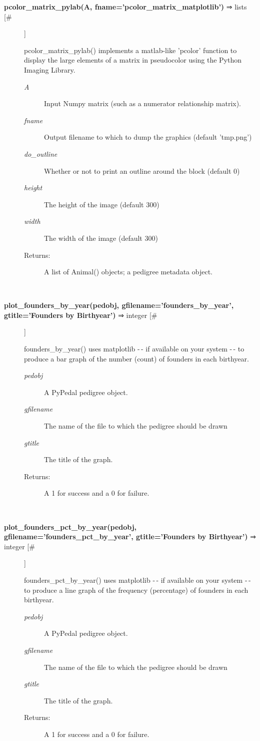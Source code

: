 \documentclass{article}
\begin{document}
\begin{description}
\item[\textbf{pcolor\_matrix\_pylab(A, fname='pcolor\_matrix\_matplotlib')} ⇒ lists [\#]
]
\par pcolor\_matrix\_pylab() implements a matlab-like 'pcolor' function to
display the large elements of a matrix in pseudocolor using the Python Imaging
Library.
\begin{description}
\item[\textit{A}
]
Input Numpy matrix (such as a numerator relationship matrix).
\item[\textit{fname}
]
Output filename to which to dump the graphics (default 'tmp.png')
\item[\textit{do\_outline}
]
Whether or not to print an outline around the block (default 0)
\item[\textit{height}
]
The height of the image (default 300)
\item[\textit{width}
]
The width of the image (default 300)
\item[Returns:
]
A list of Animal() objects; a pedigree metadata object.
\end{description}\\

\item[\textbf{plot\_founders\_by\_year(pedobj, gfilename='founders\_by\_year', gtitle='Founders by Birthyear')} ⇒ integer [\#]
]
\par founders\_by\_year() uses matplotlib -$\,$- if available on your system -$\,$- to produce a
bar graph of the number (count) of founders in each birthyear.
\begin{description}
\item[\textit{pedobj}
]
A PyPedal pedigree object.
\item[\textit{gfilename}
]
The name of the file to which the pedigree should be drawn
\item[\textit{gtitle}
]
The title of the graph.
\item[Returns:
]
A 1 for success and a 0 for failure.
\end{description}\\

\item[\textbf{plot\_founders\_pct\_by\_year(pedobj, gfilename='founders\_pct\_by\_year', gtitle='Founders by Birthyear')} ⇒ integer [\#]
]
\par founders\_pct\_by\_year() uses matplotlib -$\,$- if available on your system -$\,$- to produce a
line graph of the frequency (percentage) of founders in each birthyear.
\begin{description}
\item[\textit{pedobj}
]
A PyPedal pedigree object.
\item[\textit{gfilename}
]
The name of the file to which the pedigree should be drawn
\item[\textit{gtitle}
]
The title of the graph.
\item[Returns:
]
A 1 for success and a 0 for failure.
\end{description}\\


\end{description}
\end{document}
